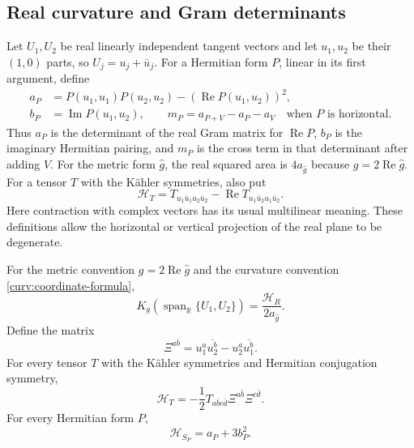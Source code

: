 \subsection{Real curvature and Gram determinants}

Let $U_1,U_2$ be real linearly independent tangent vectors and let
$u_1,u_2$ be their $(1,0)$ parts, so $U_j=u_j+\bar u_j$.
For a Hermitian form $P$, linear in its first argument, define
\begin{equation}\label{curv:gram-quantities}
 \begin{aligned}
 a_P&=P(u_1,u_1)P(u_2,u_2)
             -(\operatorname{Re}P(u_1,u_2))^2,\\
 b_P&=\operatorname{Im}P(u_1,u_2),\qquad
 m_P=a_{P+V}-a_P-a_V\quad\text{when $P$ is horizontal}.
 \end{aligned}
\end{equation}
Thus $a_P$ is the determinant of the real Gram matrix for
$\operatorname{Re}P$, $b_P$ is the imaginary Hermitian pairing, and
$m_P$ is the cross term in that determinant after adding $V$.
For the metric form $\widehat g$, the real squared area is
$4a_{\widehat g}$ because $g=2\operatorname{Re}\widehat g$.
For a tensor $T$ with the K\"ahler symmetries, also put
\[
 \mathcal H_T=T_{u_1\bar u_1u_2\bar u_2}
       -\operatorname{Re}T_{u_1\bar u_2u_1\bar u_2}.
\]
Here contraction with complex vectors has its usual multilinear
meaning.  These definitions allow the horizontal or vertical projection
of the real plane to be degenerate.

\begin{lemma}\label{curv:real-plane}
For the metric convention $g=2\operatorname{Re}\widehat g$ and
the curvature convention \eqref{curv:coordinate-formula},
\begin{equation}\label{curv:sectional}
 K_g(\operatorname{span}_{\mathbb R}\{U_1,U_2\})
       =\frac{\mathcal H_R}{2a_{\widehat g}}.
\end{equation}
Define the matrix
\begin{equation}\label{curv:xi-definition}
 \Xi^{a\bar b}=u_1^a\overline{u_2^b}
                   -u_2^a\overline{u_1^b}.
\end{equation}
For every tensor $T$ with the K\"ahler symmetries and Hermitian
conjugation symmetry,
\begin{equation}\label{curv:xi-contraction}
 \mathcal H_T=-\frac12
 T_{a\bar b c\bar d}\Xi^{a\bar b}\Xi^{c\bar d}.
\end{equation}
For every Hermitian form $P$,
\begin{equation}\label{curv:S-contraction}
 \mathcal H_{S_P}=a_P+3b_P^2.
\end{equation}
\end{lemma}

